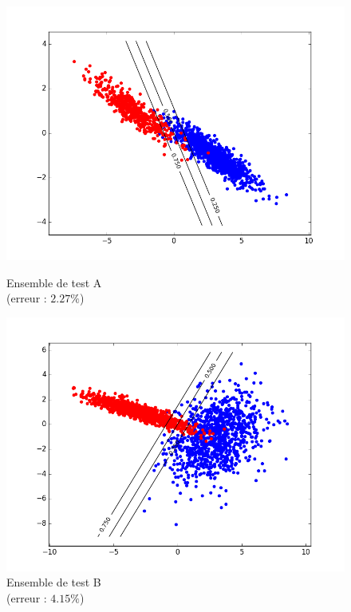 \documentclass[paper=a4, fontsize=11pt]{article}
\begin{document}
\begin{figure}[h]
 \begin{minipage}[b]{.3\linewidth}
 \begin{center}
 \includegraphics[scale=0.25]{figures/log_reg_A_test.png}
  \caption*{Ensemble de test A \\ (erreur : $2.27\%$)}
 \end{center}
 \end{minipage} \hfill
 \begin{minipage}[b]{.3\linewidth}
  \includegraphics[scale=0.25]{figures/log_reg_B_test.png}
  \caption*{Ensemble de test B \\ (erreur : $4.15\%$)}
 \end{minipage} \hfill

\end{figure}
\end{document}
